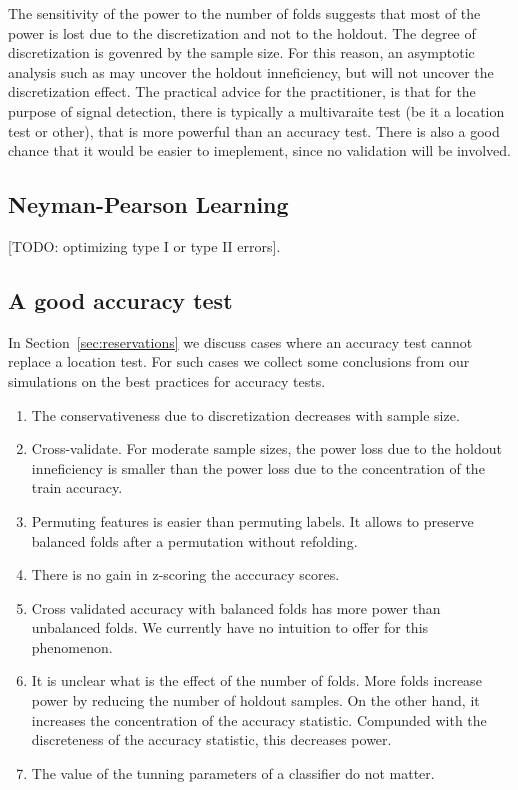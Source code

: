 \documentclass[12pt,a4paper]{article}
\begin{document}
The sensitivity of the power to the number of folds suggests that most of the power is lost due to the discretization and not to the holdout. 
The degree of discretization is govenred by the sample size. 
For this reason, an asymptotic analysis such as \cite{ramdas_classification_2016} may uncover the holdout inneficiency, but will not uncover the discretization effect. 
The practical advice for the practitioner, is that for the purpose of signal detection, there is typically a multivaraite test (be it a location test or other), that is more powerful than an accuracy test. 
There is also a good chance that it would be easier to imeplement, since no validation will be involved. 


\subsection{Neyman-Pearson Learning}
[TODO: optimizing type I or type II errors].
\cite{scott_neyman-pearson_2005}



\subsection{A good accuracy test}
In Section~\ref{sec:reservations} we discuss cases where an accuracy test cannot replace a location test.
For such cases we collect some conclusions from our simulations on the best practices for accuracy tests.
\begin{enumerate}
\item The conservativeness due to discretization decreases with sample size. 
\item Cross-validate. For moderate sample sizes, the power loss due to the holdout inneficiency is smaller than the power loss due to the concentration of the train accuracy. 
\item Permuting features is easier than permuting labels. It allows to preserve balanced folds after a permutation without refolding. 
\item There is no gain in z-scoring the acccuracy scores. 
\item Cross validated accuracy with balanced folds has more power than unbalanced folds. We currently have no intuition to offer for this phenomenon.
\item It is unclear what is the effect of the number of folds. More folds increase power by reducing the number of holdout samples. On the other hand, it increases the concentration of the accuracy statistic. Compunded with the discreteness of the accuracy statistic, this decreases power. 
\item The value of the tunning parameters of a classifier do not matter. 
\end{enumerate}
\end{document}

